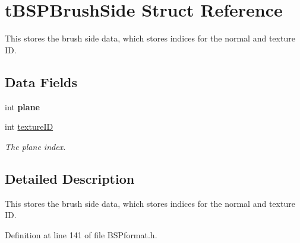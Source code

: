 \hypertarget{structt_b_s_p_brush_side}{}\section{t\+B\+S\+P\+Brush\+Side Struct Reference}
\label{structt_b_s_p_brush_side}


This stores the brush side data, which stores indices for the normal and texture ID.  


\subsection*{Data Fields}
\begin{DoxyCompactItemize}
\item 
int {\bfseries plane}\hypertarget{structt_b_s_p_brush_side_a2ed2be63b561c0d658513dc5fe589b2d}{}\label{structt_b_s_p_brush_side_a2ed2be63b561c0d658513dc5fe589b2d}

\item 
int \hyperlink{structt_b_s_p_brush_side_a105080a44777702221236663fbe0926f}{texture\+ID}\hypertarget{structt_b_s_p_brush_side_a105080a44777702221236663fbe0926f}{}\label{structt_b_s_p_brush_side_a105080a44777702221236663fbe0926f}

\begin{DoxyCompactList}\small\item\em The plane index. \end{DoxyCompactList}\end{DoxyCompactItemize}


\subsection{Detailed Description}
This stores the brush side data, which stores indices for the normal and texture ID. 

Definition at line 141 of file B\+S\+Pformat.\+h.

